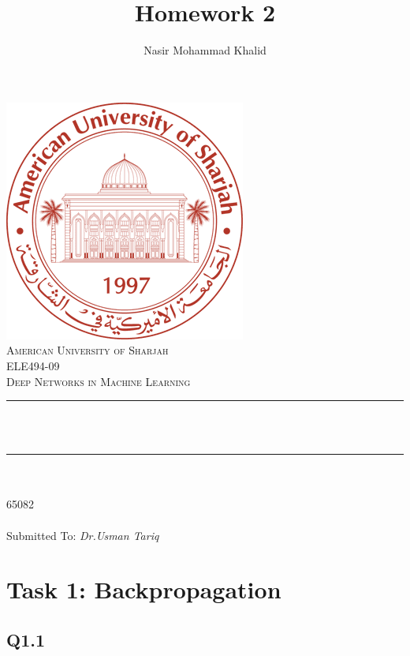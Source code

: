 \documentclass[a4paper, 12pt]{article}
\title{Homework 2}
\author{Nasir Mohammad Khalid}
\makeatletter
\let\thetitle\@title
\let\theauthor\@author
\let\thedate\@date
\makeatother
\begin{document}
 
    \begin{titlepage}
        \centering
        \vspace*{0.5 cm}
        \includegraphics[scale = 0.60]{logo.png}\\[1.0 cm]	%
        \textsc{\LARGE American University of Sharjah}\\[1.0 cm]
        \textsc{\Large ELE494-09}\\[0.2 cm]	
        \textsc{\Large Deep Networks in Machine Learning}\\[0.5 cm]			%
        \rule{\linewidth}{0.2 mm} \\[0.4 cm]
        { \huge \bfseries \thetitle}\\
        \rule{\linewidth}{0.2 mm} \\[1.5 cm]
        
        \textsc{\Large{\theauthor}}\\[0.3 cm]
        \textsc{\Large{65082}}\\[0.3 cm]
        \textsc{\Large{\thedate}}\\[1.5 cm]

        \textmd{Submitted To: \itshape{Dr.Usman Tariq}}
    \end{titlepage}

    \clearpage
    \tableofcontents
    \listoffigures
    \lstlistoflistings
    \clearpage

    \section{Task 1: Backpropagation}

    \subsection{Q1.1}
\end{document}
